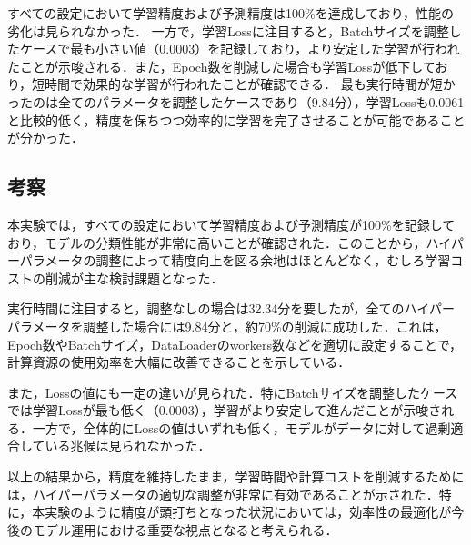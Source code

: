 \documentclass[a4paper,11pt,titlepage]{jsarticle}
\begin{document}
すべての設定において学習精度および予測精度は100\%を達成しており，性能の劣化は見られなかった．
一方で，学習Lossに注目すると，Batchサイズを調整したケースで最も小さい値（0.0003）を記録しており，より安定した学習が行われたことが示唆される．また，Epoch数を削減した場合も学習Lossが低下しており，短時間で効果的な学習が行われたことが確認できる．
最も実行時間が短かったのは全てのパラメータを調整したケースであり（9.84分），学習Lossも0.0061と比較的低く，精度を保ちつつ効率的に学習を完了させることが可能であることが分かった．

\subsection{考察}
本実験では，すべての設定において学習精度および予測精度が100\%を記録しており，モデルの分類性能が非常に高いことが確認された．このことから，ハイパーパラメータの調整によって精度向上を図る余地はほとんどなく，むしろ学習コストの削減が主な検討課題となった．

実行時間に注目すると，調整なしの場合は32.34分を要したが，全てのハイパーパラメータを調整した場合には9.84分と，約70\%の削減に成功した．これは，Epoch数やBatchサイズ，DataLoaderのworkers数などを適切に設定することで，計算資源の使用効率を大幅に改善できることを示している．

また，Lossの値にも一定の違いが見られた．特にBatchサイズを調整したケースでは学習Lossが最も低く（0.0003），学習がより安定して進んだことが示唆される．一方で，全体的にLossの値はいずれも低く，モデルがデータに対して過剰適合している兆候は見られなかった．

以上の結果から，精度を維持したまま，学習時間や計算コストを削減するためには，ハイパーパラメータの適切な調整が非常に有効であることが示された．特に，本実験のように精度が頭打ちとなった状況においては，効率性の最適化が今後のモデル運用における重要な視点となると考えられる．
\end{document}
